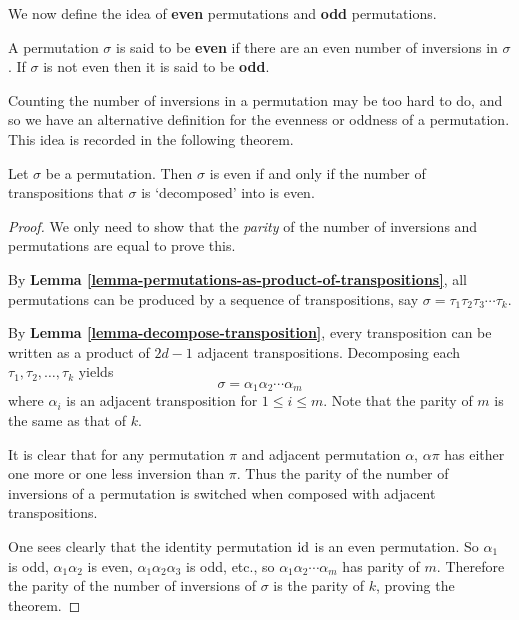 We now define the idea of \textbf{even} permutations and \textbf{odd} permutations.
\begin{definition}
    A permutation $\sigma$ is said to be \textbf{even} if there are an even number of inversions in $\sigma$. If $\sigma$ is not even then it is said to be \textbf{odd}.
\end{definition}

Counting the number of inversions in a permutation may be too hard to do, and so we have an alternative definition for the evenness or oddness of a permutation. This idea is recorded in the following theorem.

\begin{theorem}\label{thrm-parity-of-permutation}
    Let $\sigma$ be a permutation. Then $\sigma$ is even if and only if the number of transpositions that $\sigma$ is `decomposed' into is even.
\end{theorem}

\begin{proof}
    We only need to show that the \textit{parity} of the number of inversions and permutations are equal to prove this.

    By \textbf{Lemma \ref{lemma-permutations-as-product-of-transpositions}}, all permutations can be produced by a sequence of transpositions, say $\sigma = \tau_1\tau_2\tau_3\cdots\tau_k$.

    By \textbf{Lemma \ref{lemma-decompose-transposition}}, every transposition can be written as a product of $2d - 1$ adjacent transpositions. Decomposing each $\tau_1, \tau_2, \dots, \tau_k$ yields
    \[
        \sigma = \alpha_1\alpha_2\cdots\alpha_m
    \]
    where $\alpha_i$ is an adjacent transposition for $1 \leq i \leq m$. Note that the parity of $m$ is the same as that of $k$.

    It is clear that for any permutation $\pi$ and adjacent permutation $\alpha$, $\alpha\pi$ has either one more or one less inversion than $\pi$. Thus the parity of the number of inversions of a permutation is switched when composed with adjacent transpositions.

    One sees clearly that the identity permutation $\mathrm{id}$ is an even permutation. So $\alpha_1$ is odd, $\alpha_1\alpha_2$ is even, $\alpha_1\alpha_2\alpha_3$ is odd, etc., so $\alpha_1\alpha_2\cdots\alpha_m$ has parity of $m$. Therefore the parity of the number of inversions of $\sigma$ is the parity of $k$, proving the theorem.
\end{proof}

